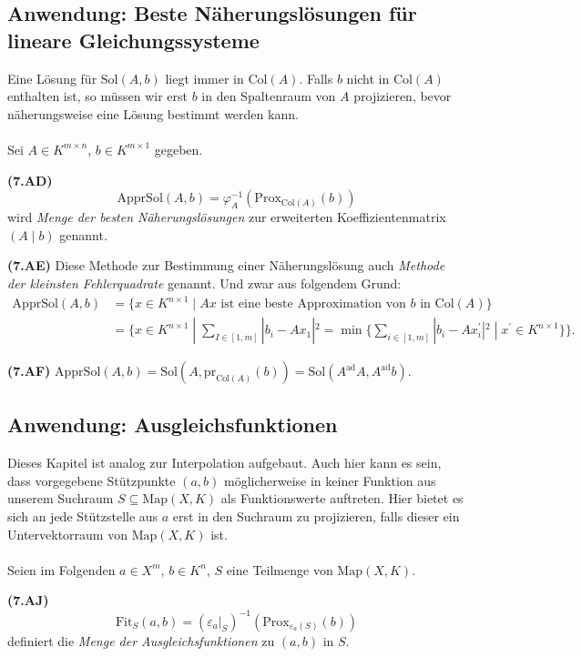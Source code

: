 \documentclass[a4paper,parskip=half*,DIV=15,fontsize=11pt]{scrartcl}
\newlength{\hangwidth}
\newcommand{\skript}[1]{\settowidth{\hangwidth}{\textbf{(#1)} }\hangpara{\hangwidth}{1}\textbf{(#1)} \ignorespaces} %
\newcommand{\Sol}{\mathrm{Sol}} %
\newcommand{\Col}{\mathrm{Col}} %
\newcommand{\Map}{\mathrm{Map}} %
\newcommand{\pr}{\mathrm{pr}} %
\newcommand{\Prox}{\mathrm{Prox}} %
\newcommand{\ApprSol}{\mathrm{ApprSol}} %
\newcommand{\Fit}{\mathrm{Fit}} %
\newcommand{\adjoint}[1]{#1^{\mathrm{ad}}}
\begin{document}
\subsection{Anwendung: Beste Näherungslösungen für lineare Gleichungssysteme}

Eine Lösung für $\Sol(A,b)$ liegt immer in $\Col(A)$. Falls $b$ nicht in $\Col(A)$ enthalten ist, so müssen wir erst $b$ in den Spaltenraum von $A$ projizieren, bevor näherungsweise eine Lösung bestimmt werden kann.\\
\\
Sei $A \in K^{m \times n}$, $b \in K^{m \times 1}$ gegeben.

\skript{7.AD} $$\ApprSol(A, b) = \varphi_A^{-1}(\Prox_{\Col(A)}(b)) $$ wird \textit{Menge der besten Näherungslösungen} zur erweiterten Koeffizientenmatrix $(A\;|\;b)$ genannt.

\skript{7.AE} Diese Methode zur Bestimmung einer Näherungslösung auch \textit{Methode der kleinsten Fehlerquadrate} genannt. Und zwar aus folgendem Grund:
\begin{align*}
	\ApprSol(A, b)
	& = \{x \in K^{n \times 1}\;|\;Ax \text{ ist eine beste Approximation von } b \text{ in } \Col(A)\} \\
	& = \{x \in K^{n \times 1}\;|\; \sum_{I \in [1,m]} |b_i - Ax_1|^2 = \min\{\sum_{i \in [1,m]} |b_i - Ax_i^\prime|^2 \;|\; x^\prime \in K^{n \times 1}\}\}.
\end{align*}

\skript{7.AF} $\ApprSol(A, b) = \Sol(A, \pr_{\Col(A)}(b)) = \Sol(\adjoint{A}A, \adjoint{A}b).$

\subsection{Anwendung: Ausgleichsfunktionen}

Dieses Kapitel ist analog zur Interpolation aufgebaut. Auch hier kann es sein, dass vorgegebene Stützpunkte $(a,b)$ möglicherweise in keiner Funktion aus unserem Suchraum $S \subseteq \Map(X,K)$ als Funktionswerte auftreten. Hier bietet es sich an jede Stützstelle aus $a$ erst in den Suchraum zu projizieren, falls dieser ein Untervektorraum von $\Map(X,K)$ ist. \\
\\
Seien im Folgenden $a \in X^m$, $b \in K^n$, $S$ eine Teilmenge von $\Map(X,K)$.

\skript{7.AJ} $$\Fit_S(a,b) = (\varepsilon_a|_S)^{-1}(\Prox_{\varepsilon_a(S)}(b))$$
definiert die \textit{Menge der Ausgleichsfunktionen} zu $(a,b)$ in $S$.
\end{document}
